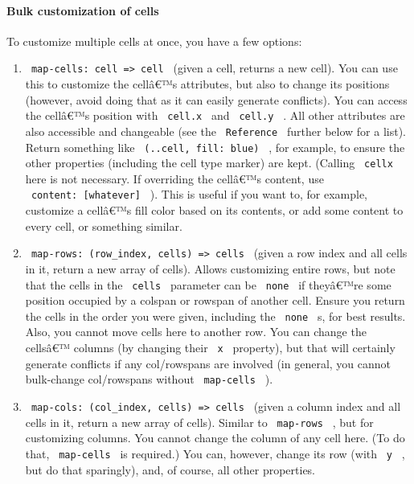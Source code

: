 
\paragraph{Bulk customization of
cells}\label{bulk-customization-of-cells}

To customize multiple cells at once, you have a few options:

\begin{enumerate}
\item
  \texttt{\ map-cells:\ cell\ =\textgreater{}\ cell\ } (given a cell,
  returns a new cell). You can use this to customize the cellâ€™s
  attributes, but also to change its positions (however, avoid doing
  that as it can easily generate conflicts). You can access the cellâ€™s
  position with \texttt{\ cell.x\ } and \texttt{\ cell.y\ } . All other
  attributes are also accessible and changeable (see the
  \texttt{\ Reference\ } further below for a list). Return something
  like \texttt{\ (..cell,\ fill:\ blue)\ } , for example, to ensure the
  other properties (including the cell type marker) are kept. (Calling
  \texttt{\ cellx\ } here is not necessary. If overriding the cellâ€™s
  content, use \texttt{\ content:\ {[}whatever{]}\ } ). This is useful
  if you want to, for example, customize a cellâ€™s fill color based on
  its contents, or add some content to every cell, or something similar.
\item
  \texttt{\ map-rows:\ (row\_index,\ cells)\ =\textgreater{}\ cells\ }
  (given a row index and all cells in it, return a new array of cells).
  Allows customizing entire rows, but note that the cells in the
  \texttt{\ cells\ } parameter can be \texttt{\ none\ } if theyâ€™re
  some position occupied by a colspan or rowspan of another cell. Ensure
  you return the cells in the order you were given, including the
  \texttt{\ none\ } s, for best results. Also, you cannot move cells
  here to another row. You can change the cellsâ€™ columns (by changing
  their \texttt{\ x\ } property), but that will certainly generate
  conflicts if any col/rowspans are involved (in general, you cannot
  bulk-change col/rowspans without \texttt{\ map-cells\ } ).
\item
  \texttt{\ map-cols:\ (col\_index,\ cells)\ =\textgreater{}\ cells\ }
  (given a column index and all cells in it, return a new array of
  cells). Similar to \texttt{\ map-rows\ } , but for customizing
  columns. You cannot change the column of any cell here. (To do that,
  \texttt{\ map-cells\ } is required.) You can, however, change its row
  (with \texttt{\ y\ } , but do that sparingly), and, of course, all
  other properties.
\end{enumerate}

